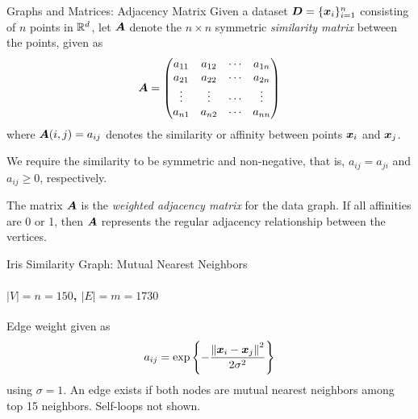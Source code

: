 
\date{Chapter 16: Spectral \& Graph Clustering}

\begin{frame}
\titlepage
\end{frame}


\begin{frame}{Graphs and Matrices: Adjacency Matrix}
Given a dataset ${\boldsymbol D} = \{{\boldsymbol x}_i \}_{i=1}^n$ consisting of $n$ points in ${\mathord{\mathbb R}}^d$, let ${\boldsymbol A}$
denote the $n \times n$ symmetric {\em similarity matrix} between
the points, given as
\begin{align*}
    {\boldsymbol A} = \begin{pmatrix} 
        a_{11} & a_{12} & \cdots & a_{1n}\\
        a_{21} & a_{22} & \cdots & a_{2n}\\
        \vdots & \vdots & \cdots & \vdots\\
        a_{n1} & a_{n2} & \cdots & a_{nn}\\
     \end{pmatrix}
\end{align*}
where ${\boldsymbol A}(i,j) = a_{ij}$ denotes the similarity or aff\/{i}nity
between points ${\boldsymbol x}_i$ and ${\boldsymbol x}_{j}$. 

\medskip
We require the similarity to
be symmetric and non-negative, that is, $a_{ij} = a_{ji}$ and $a_{ij}
\ge 0$, respectively. 

\medskip
The matrix ${\boldsymbol A}$ is 
the {\em weighted adjacency matrix} for the data graph.
If all aff\/{i}nities are 0 or 1, then ${\boldsymbol A}$ represents
the regular adjacency relationship between the vertices.
\end{frame}


\begin{frame}{Iris Similarity Graph: Mutual Nearest Neighbors}
  \framesubtitle{$|V|=n=150$, $|E|=m=1730$}
\begin{figure}
    \centerline{
    }
\end{figure}
Edge weight given as
\begin{align*}
    a_{ij} =
    \exp \left\{-{\left\lVert{\boldsymbol x}_i - {\boldsymbol x}_{j}\right\rVert^2 \over 2\sigma^2} \right\}
\end{align*}
using $\sigma=1$. An edge exists if both nodes are mutual nearest
neighbors among top 15 neighbors. Self-loops not shown.
\end{frame}



